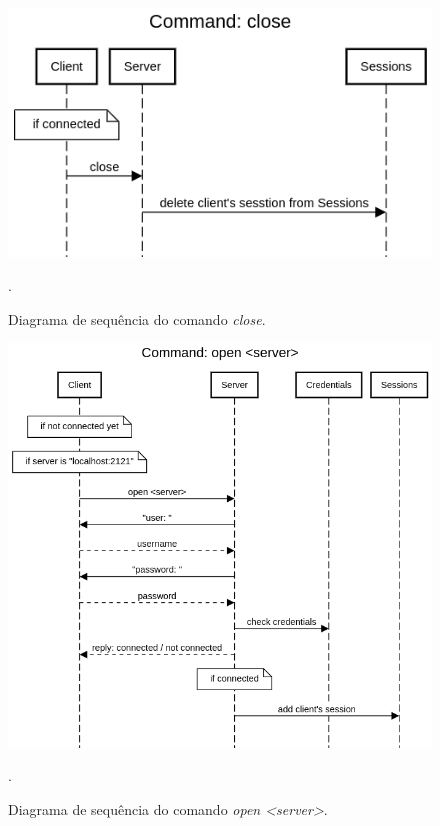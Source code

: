 \documentclass[conference]{IEEEtran}
\begin{document}
\begin{figure}[H]
\centering
\centerline{\includegraphics[scale=0.4]{diagrams/Command_close.png}}
\caption{Diagrama de sequência do comando \textit{close}.}.
\label{close}
\end{figure}

\begin{figure}[H]
\centering
\centerline{\includegraphics[scale=0.4]{diagrams/Command_open_server.png}}
\caption{Diagrama de sequência do comando \textit{open <server>}.}.
\label{open}
\end{figure}
\end{document}
